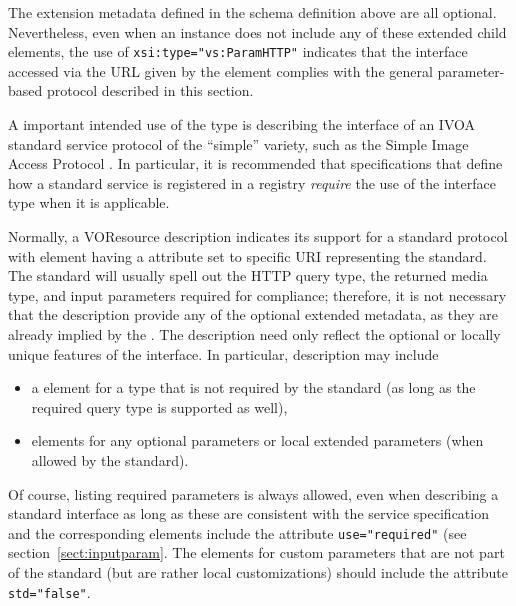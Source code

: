 \documentclass[11pt,a4paper]{ivoa}
\begin{document}

The extension metadata defined in the schema definition above are all
optional.  Nevertheless, even when an 
instance does not include any of these extended child elements, the
use of \verb|xsi:type="vs:ParamHTTP"| indicates that the interface
accessed via the URL given by the 
element complies with the general parameter-based protocol described
in this section.






A important intended use of the  type is
describing the interface of an IVOA standard service protocol 
of the ``simple'' variety, such as the Simple Image Access Protocol
\citep{2015ivoa.spec.1223D}.  In particular, it is recommended that
specifications that define how a standard service is registered in a
registry \emph{require} the use of the 
interface type when it is applicable.



Normally, a VOResource
description indicates its support for a standard protocol with
 element having a
 attribute set to specific URI representing the
standard.  The standard will usually spell out the HTTP query type,
the returned media type, and input parameters required for compliance;
therefore, it is not necessary that the 
description provide any of the optional extended metadata, as they are
already implied by the .  The description need
only reflect the optional or locally unique features of the
interface.  In particular, description may include


\begin{itemize}
\item a  element for a type that is not
  required by the standard (as long as the required query type is
  supported as well),

\item {}\/ elements for any optional parameters
       or local extended parameters (when allowed by the standard).
\end{itemize}


Of course, listing required parameters is always allowed, even when
describing a standard interface as long as these are consistent with
the service specification and the corresponding 
elements include the attribute \verb|use="required"| (see
section~\ref{sect:inputparam}.  The 
elements for custom parameters that are not part of the standard (but
are rather local customizations) should include the attribute
\verb|std="false"|.
\end{document}
